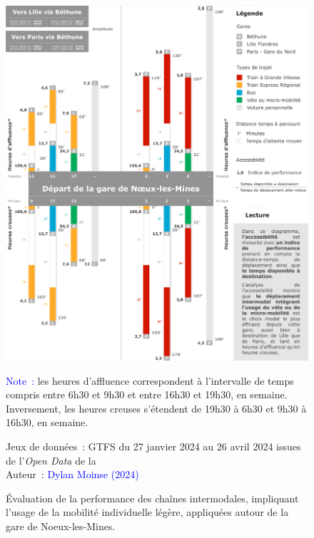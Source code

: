 \begin{refsegment}
    \begin{figure}[h!]\vspace*{4pt}
        \caption{Évaluation de la performance des chaînes intermodales, impliquant l'usage de la mobilité individuelle légère, appliquées autour de la gare de Noeux-les-Mines.}
        \label{fig-chap5:performance-detours-noeux}
        \centerline{\includegraphics[width=1\columnwidth]{src/Figures/Chap-5/FR_Detours_Performance_Noeux_les_Mines.pdf}}
        \vspace{5pt}
        \begin{flushleft}\scriptsize{
        \textcolor{blue}{Note~:} les heures d'affluence correspondent à l'intervalle de temps compris entre 6h30 et 9h30 et entre 16h30 et 19h30, en semaine. Inversement, les heures creuses s'étendent de 19h30 à 6h30 et 9h30 à 16h30, en semaine.
        }\end{flushleft}
        \begin{flushright}\scriptsize{
        Jeux de données~: \acrshort{GTFS} du 27 janvier 2024 au 26 avril 2024 issues de l'\textsl{Open Data} de la \textcolor{blue}{\textcite{sncf_sncf_2022}}
        \\
        Auteur~: \textcolor{blue}{Dylan Moinse (2024)}
        }\end{flushright}
    \end{figure}


\end{refsegment}

